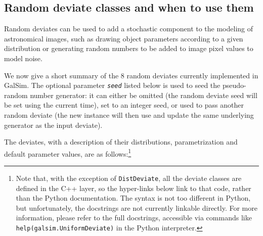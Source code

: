 \documentclass[preprint,10pt]{../../devel/modules/aastex}
\begin{document}
\subsection{Random deviate classes and when to use them}
Random deviates can be used to add a stochastic
component to the modeling of astronomical images, such as drawing
object parameters according to a given distribution or generating random
numbers to be added to image pixel values to model noise.

We now give a short summary of the 8 random deviates currently
implemented in GalSim.   The optional parameter \emph{\texttt{seed}}
listed below is used
to seed the pseudo-random number generator: it can
either be omitted (the random deviate seed will be set using the
current time), set to an integer seed, or used to pass another random
deviate (the new instance will then use and update the same underlying
generator as the input deviate).

The deviates, with a description of their distributions, parametrization and
default parameter values, are as follows:\footnote{
Note that, with the exception of \texttt{DistDeviate},
all the deviate classes are defined in the C++ layer, so the hyper-links
below link to that code, rather than the Python documentation.  The
syntax is not too different in Python, but unfortunately, the docstrings
are not currently linkable directly.
For more information, please refer to the full docstrings, accessible
via commands like \texttt{help(galsim.UniformDeviate)} in the Python interpreter.}
\end{document}
